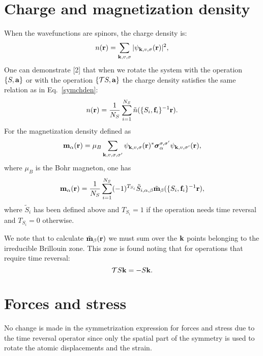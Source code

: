 \documentclass[12pt,a4paper,twoside]{report}
\begin{document}
\section{Charge and magnetization density}
When the wavefunctions are spinors, the charge density is:
\begin{equation}
n({\bf r}) = \sum_{{\bf k}, v, \sigma} |\psi_{{\bf k}, v, \sigma} ({\bf r}) |^2,
\end{equation}
One can demonstrate [2] that when we rotate the system with the operation $\{S,{\bf a}\}$ or with the operation $\{\mathcal{T} S,{\bf a}\}$
the charge density satisfies the same relation as in Eq.~\ref{symchden}:
\begin{equation}
n({\bf r}) = {1 \over N_S} \sum_{i=1}^{N_S} \tilde n ( \{S_i,{\bf f}_i\}^{-1} {\bf r}).
\end{equation}
For the magnetization density defined as
\begin{equation}
{\bf m}_\alpha({\bf r}) = \mu_B \sum_{{\bf k}, v, \sigma,\sigma'} \psi_{{\bf k}, v, \sigma} ({\bf r})^* \boldsymbol{\sigma}_{\alpha}^{\sigma,\sigma'}
\psi_{{\bf k}, v, \sigma'} ({\bf r}),
\end{equation}
where $\mu_B$ is the Bohr magneton, one has
\begin{equation}
{\bf m}_\alpha({\bf r}) = {1 \over N_S} \sum_{i=1}^{N_S} (-1)^{T_{S_i}} \tilde S_{i,\alpha,\beta} \tilde {\bf m}_{\beta} ( \{S_i,{\bf f}_i\}^{-1} {\bf r}),
\label{symmag}
\end{equation}
where $\tilde S_i$ has been defined above and 
$T_{S_i}=1$ if the operation needs time reversal and $T_{S_i}=0$ otherwise.

We note that to calculate 
$\tilde {\bf m}_{\beta} ({\bf r})$ we must sum over the ${\bf k}$ points belonging to the irreducible Brillouin zone. This zone is found noting that for operations that require time reversal:
\begin{equation}
\mathcal{T} S{\bf k} = - S{\bf k}.
\end{equation}

\section{Forces and stress}
No change is made in the symmetrization expression for forces and stress due to the
time reversal operator since only the spatial part of the symmetry is used to rotate the atomic displacements and the strain.
\end{document}
